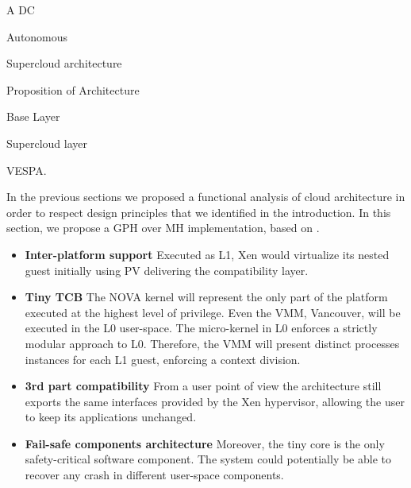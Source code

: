 \documentclass{sig-alternate}
\begin{document}
A DC 

Autonomous

Supercloud architecture

Proposition of Architecture

Base Layer

Supercloud layer

VESPA.

In the previous sections we proposed a functional analysis of cloud architecture in order to respect design principles that we identified in the introduction. In this section, we propose a GPH over MH implementation, based on .

\begin{itemize}[]
\item \textbf{Inter-platform support} Executed as L1, Xen would virtualize its nested guest initially using PV delivering the compatibility layer.
\item \textbf{Tiny TCB} The NOVA kernel will represent the only part of the platform executed at the highest level of privilege. Even the VMM, Vancouver, will be executed in the L0 user-space. The micro-kernel in L0 enforces a strictly modular approach to L0. Therefore, the VMM will present distinct processes instances for each L1 guest, enforcing a context division.
\item \textbf{3rd part compatibility} From a user point of view the architecture still exports the same interfaces provided by the Xen hypervisor, allowing the user to keep its applications unchanged.
\item \textbf{Fail-safe components architecture} Moreover, the tiny core is the only safety-critical software component. The system could potentially be able to recover any crash in different user-space components.
\end{itemize}
\end{document}
